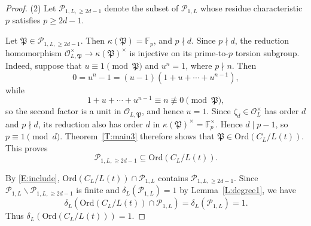 \documentclass[10pt,a4paper]{amsart}
\newcommand{\F}{\mathbb{F}}
\newcommand{\Ord}{\mathrm{Ord}} %
\newcommand{\cO}{\mathcal{O}}
\newcommand{\cP}{\mathcal{P}}
\newcommand{\fP}{\mathfrak{P}}
\begin{document}
\begin{proof}
(2)
Let $\cP_{1,L,\ge 2d-1}$ denote the
subset of $\cP_{1,L}$ whose residue characteristic $p$ satisfies
$p\ge 2d-1$.

Let $\fP\in\cP_{1,L,\ge 2d-1}$.
Then $\kappa(\fP)=\F_p$, and $p\nmid d$.
Since $p\nmid d$, the reduction homomorphism
$\cO_{L,\fP}^\times \longrightarrow \kappa(\fP)^\times$
is injective on its prime-to-$p$ torsion subgroup.
Indeed, suppose that $u\equiv 1\pmod \fP$ and $u^n=1$, where $p\nmid n$.
Then $$0=u^n-1=(u-1)(1+u+\cdots+u^{n-1}),$$
while
\[
1+u+\cdots+u^{n-1}\equiv n \not\equiv 0 \pmod \fP,
\]
so the second factor is a unit in $\cO_{L,\fP}$, and hence $u=1$.
Since $\zeta_d\in\cO_L^\times$
has order $d$ and $p\nmid d$, its reduction also has order $d$ in
$\kappa(\fP)^\times = \F_p^\times$.
Hence
$d\mid p-1$, so
$p\equiv 1\pmod d$.
Theorem~\ref{T:main3} therefore shows that
$\fP\in\Ord(C_L/L(t))$.
This proves
\begin{equation}\label{E:include}
\cP_{1,L,\ge 2d-1}\subseteq \Ord(C_L/L(t)).
\end{equation}

By \eqref{E:include}, $\Ord(C_L/L(t))\cap\cP_{1,L}$ contains
$\cP_{1,L,\ge 2d-1}$.
Since $\cP_{1,L}\backslash \cP_{1,L,\ge 2d-1}$ is finite and $\delta_L(\cP_{1,L})=1$
by Lemma~\ref{L:degree1}, we have
\begin{equation}\label{E:fff}
\delta_L(\Ord(C_L/L(t))\cap \cP_{1,L})=\delta_L(\cP_{1,L})=1.
\end{equation}
Thus $\delta_L(\Ord(C_L/L(t)))=1$.
\end{proof}
\end{document}
